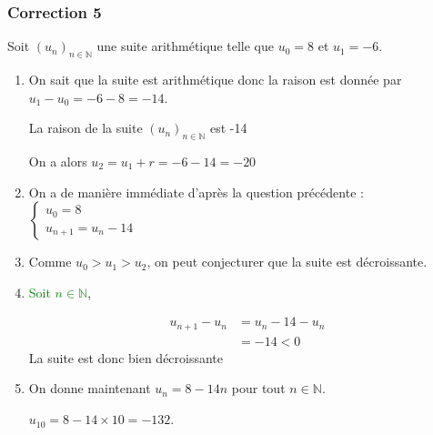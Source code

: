 \documentclass[15pt, mathserif]{beamer}
\newcommand{\N}{\mathbb{N}}			%
\newcommand{\st}[1]{$(#1_n)_{n \in \N}$}
\begin{document}
\begin{frame}
\vspace{-10mm}
	\frametitle{Correction 5}
Soit \st{u} une suite arithmétique telle que $u_0=8$ et $u_1=-6$. 
 
 \begin{enumerate} 
 	 \item On sait que la suite est arithmétique donc la raison est donnée par $u_1-u_0= -6-8=-14$. 
 
 La raison de la suite \st{u} est -14
 
 On a alors $u_2=u_1+r=-6-14=-20$ 
 \vfil 
 	 \item On a de manière immédiate d'après la question précédente : 
 \hfil$\begin{cases} 
 u_0=8 \\ 
 u_{n+1}=u_n-14 
 \end{cases}$ 
 \vfil 
 	 \item Comme $u_0>u_1>u_2$, on peut conjecturer que la suite est décroissante.
 \end{enumerate} 
 
 \end{frame} 
 
 \begin{frame}  
 \begin{enumerate} \setcounter{enumi}{3} 
 	 \item \textcolor{green}{Soit $n \in \N$}, 
 
  \begin{align*} 
 u_{n+1}-u_n &= u_n -14-u_n \\ 
 &= -14<0 
 \end{align*}La suite est donc bien décroissante
 \vfil 
 	 \item On donne maintenant $u_n=8-14n$ pour tout $n \in \N$. 
 
  \hfil$u_{10}=8-14\times 10=-132$. 
 
 \end{enumerate} \end{frame}
\end{document}
